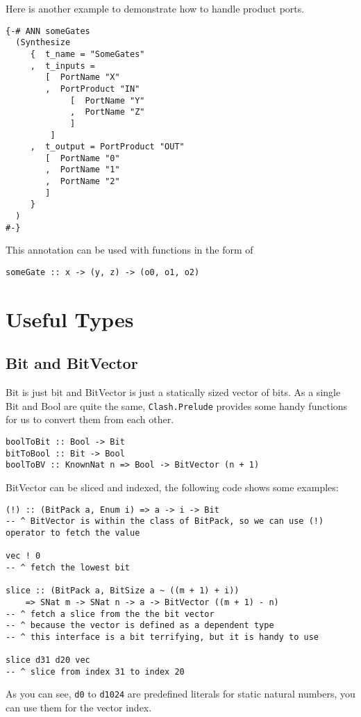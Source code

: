 Here is another example to demonstrate how to handle product ports.
\begin{verbatim}
{-# ANN someGates
  (Synthesize
     {  t_name = "SomeGates"
     ,  t_inputs = 
        [  PortName "X"
        ,  PortProduct "IN" 
             [  PortName "Y"
             ,  PortName "Z"
             ]
         ]
     ,  t_output = PortProduct "OUT" 
        [  PortName "0"
        ,  PortName "1"
        ,  PortName "2"
        ]
     }
  )
#-}
\end{verbatim}
This annotation can be used with functions in the form of 
\begin{verbatim}
someGate :: x -> (y, z) -> (o0, o1, o2)
\end{verbatim} 

\section{Useful Types}
\subsection{Bit and BitVector}
Bit is just bit and BitVector is just a statically sized vector of bits. As a single Bit and Bool are quite the same, \texttt{Clash.Prelude} provides some handy functions for us to convert them from each other.
\begin{verbatim}
boolToBit :: Bool -> Bit
bitToBool :: Bit -> Bool
boolToBV :: KnownNat n => Bool -> BitVector (n + 1)
\end{verbatim}
BitVector can be sliced and indexed, the following code shows some examples:
\begin{verbatim}
(!) :: (BitPack a, Enum i) => a -> i -> Bit
-- ^ BitVector is within the class of BitPack, so we can use (!) operator to fetch the value

vec ! 0
-- ^ fetch the lowest bit

slice :: (BitPack a, BitSize a ~ ((m + 1) + i)) 
    => SNat m -> SNat n -> a -> BitVector ((m + 1) - n)
-- ^ fetch a slice from the the bit vector
-- ^ because the vector is defined as a dependent type
-- ^ this interface is a bit terrifying, but it is handy to use

slice d31 d20 vec
-- ^ slice from index 31 to index 20
\end{verbatim}
As you can see, \texttt{d0} to \texttt{d1024} are predefined literals for static natural numbers, you can use them for the vector index.

